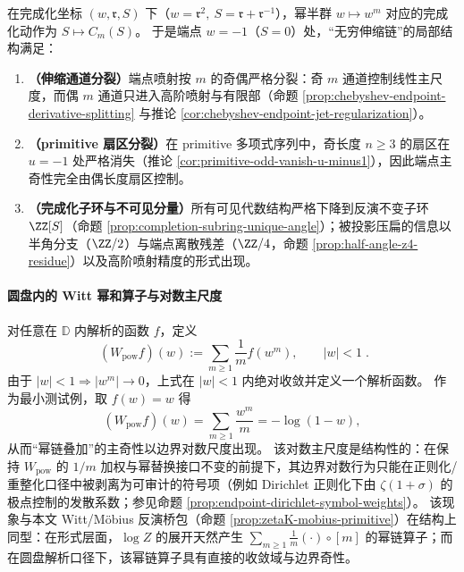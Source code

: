\begin{proposition}\label{prop:endpoint-decomposition-paradigm}
在完成化坐标 \((w,\mathfrak{r},S)\) 下（\(w=\mathfrak{r}^2,\ S=\mathfrak{r}+\mathfrak{r}^{-1}\)），幂半群 \(w\mapsto w^m\) 对应的完成化动作为 \(S\mapsto C_m(S)\)。
于是端点 \(w=-1\)（\(S=0\)）处，“无穷伸缩链”的局部结构满足：
\begin{enumerate}
  \item \textbf{（伸缩通道分裂）}端点喷射按 \(m\) 的奇偶严格分裂：奇 \(m\) 通道控制线性主尺度，而偶 \(m\) 通道只进入高阶喷射与有限部（命题 \ref{prop:chebyshev-endpoint-derivative-splitting} 与推论 \ref{cor:chebyshev-endpoint-jet-regularization}）。
  \item \textbf{（primitive 扇区分裂）}在 primitive 多项式序列中，奇长度 \(n\ge 3\) 的扇区在 \(u=-1\) 处严格消失（推论 \ref{cor:primitive-odd-vanish-u-minus1}），因此端点主奇性完全由偶长度扇区控制。
  \item \textbf{（完成化子环与不可见分量）}所有可见代数结构严格下降到反演不变子环 \(\ZZ[S]\)（命题 \ref{prop:completion-subring-unique-angle}）；被投影压扁的信息以半角分支（\(\ZZ/2\)）与端点离散残差（\(\ZZ/4\)，命题 \ref{prop:half-angle-z4-residue}）以及高阶喷射精度的形式出现。
\end{enumerate}
\end{proposition}

\paragraph{圆盘内的 Witt 幂和算子与对数主尺度}
对任意在 \(\mathbb{D}\) 内解析的函数 \(f\)，定义
\begin{equation}\label{eq:app-witt-pow-operator}
\boxed{\;
(W_{\mathrm{pow}}f)(w):=\sum_{m\ge 1}\frac{1}{m}f(w^m),\qquad |w|<1\; }.
\end{equation}
由于 \(|w|<1\Rightarrow |w^m|\to 0\)，上式在 \(|w|<1\) 内绝对收敛并定义一个解析函数。
作为最小测试例，取 \(f(w)=w\) 得
\[
(W_{\mathrm{pow}}f)(w)=\sum_{m\ge 1}\frac{w^m}{m}=-\log(1-w),
\]
从而“幂链叠加”的主奇性以边界对数尺度出现。
该对数主尺度是结构性的：在保持 \(W_{\mathrm{pow}}\) 的 \(1/m\) 加权与幂替换接口不变的前提下，其边界对数行为只能在正则化/重整化口径中被剥离为可审计的符号项（例如 Dirichlet 正则化下由 \(\zeta(1+\sigma)\) 的极点控制的发散系数；参见命题 \ref{prop:endpoint-dirichlet-symbol-weights}）。
该现象与本文 Witt/Möbius 反演桥包（命题 \ref{prop:zetaK-mobius-primitive}）在结构上同型：在形式层面，\(\log Z\) 的展开天然产生 \(\sum_{m\ge 1}\frac{1}{m}(\cdot)\circ[m]\) 的幂链算子；而在圆盘解析口径下，该幂链算子具有直接的收敛域与边界奇性。


